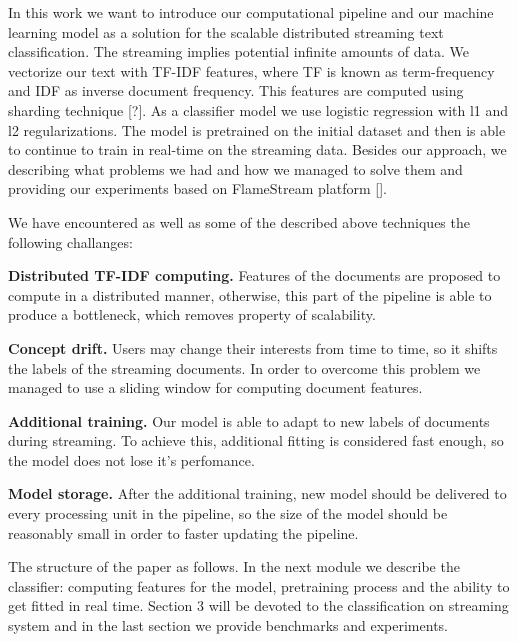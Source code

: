     In this work we want to introduce our computational pipeline and our machine learning model as a solution for the scalable distributed streaming text classification. The streaming implies potential infinite amounts of data. We vectorize our text with TF-IDF features, where TF is known as term-frequency and IDF as inverse document frequency. This features are computed using sharding technique [?]. As a classifier model we use logistic regression with l1 and l2 regularizations. The model is pretrained on the initial dataset and then is able to continue to train in real-time on the streaming data. Besides our approach, we describing what problems we had and how we managed to solve them and providing our experiments based on FlameStream platform [].
    
    We have encountered as well as some of the described above techniques the following challanges:
    
    \textbf{Distributed TF-IDF computing.} Features of the documents are proposed to compute in a distributed manner, otherwise, this part of the pipeline is able to produce a bottleneck, which removes property of scalability.
    
    \textbf{Concept drift.} Users may change their interests from time to time, so it shifts the labels of the streaming documents. In order to overcome this problem we managed to use a sliding window for computing document features.
    
    \textbf{Additional training.} Our model is able to adapt to new labels of documents during streaming. To achieve this, additional fitting is considered fast enough, so the model does not lose it's perfomance.
    
    \textbf{Model storage.} After the additional training, new model should be delivered to every processing unit in the pipeline, so the size of the model should be reasonably small in order to faster updating the pipeline.
    
    The structure of the paper as follows. In the next module we describe the classifier: computing features for the model, pretraining process and the ability to get fitted in real time. Section 3 will be devoted to the classification on streaming system and in the last section we provide benchmarks and experiments.
    
